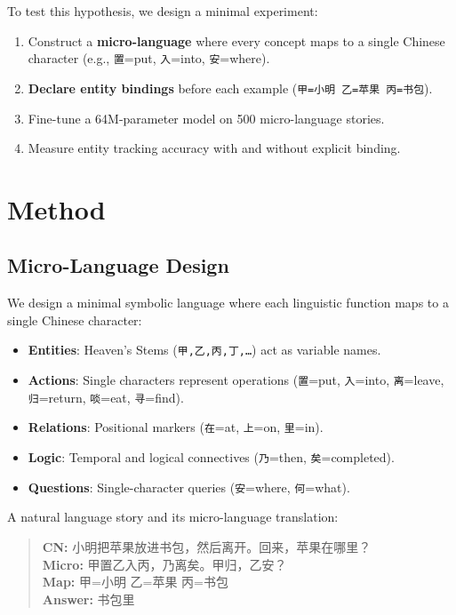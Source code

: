 \documentclass[11pt,a4paper]{article}
\begin{document}
To test this hypothesis, we design a minimal experiment:
\begin{enumerate}[nosep]
    \item Construct a \textbf{micro-language} where every concept maps to a single Chinese character (e.g., \texttt{置}=put, \texttt{入}=into, \texttt{安}=where).
    \item \textbf{Declare entity bindings} before each example (\texttt{甲=小明 乙=苹果 丙=书包}).
    \item Fine-tune a 64M-parameter model on 500 micro-language stories.
    \item Measure entity tracking accuracy with and without explicit binding.
\end{enumerate}

\section{Method}

\subsection{Micro-Language Design}

We design a minimal symbolic language where each linguistic function maps to a single Chinese character:

\begin{itemize}[nosep]
    \item \textbf{Entities}: Heaven's Stems (\texttt{甲,乙,丙,丁,\ldots}) act as variable names.
    \item \textbf{Actions}: Single characters represent operations (\texttt{置}=put, \texttt{入}=into, \texttt{离}=leave, \texttt{归}=return, \texttt{啖}=eat, \texttt{寻}=find).
    \item \textbf{Relations}: Positional markers (\texttt{在}=at, \texttt{上}=on, \texttt{里}=in).
    \item \textbf{Logic}: Temporal and logical connectives (\texttt{乃}=then, \texttt{矣}=completed).
    \item \textbf{Questions}: Single-character queries (\texttt{安}=where, \texttt{何}=what).
\end{itemize}

A natural language story and its micro-language translation:

\begin{quote}
\textbf{CN:} 小明把苹果放进书包，然后离开。回来，苹果在哪里？ \\
\textbf{Micro:} 甲置乙入丙，乃离矣。甲归，乙安？ \\
\textbf{Map:} 甲=小明 乙=苹果 丙=书包 \\
\textbf{Answer:} 书包里
\end{quote}
\end{document}
